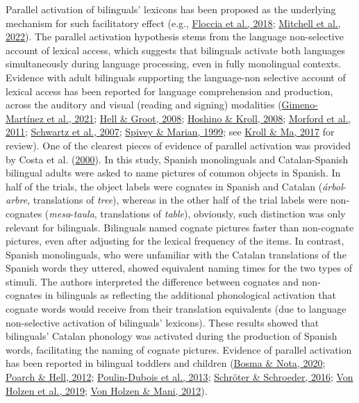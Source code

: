 \documentclass[
]{article}
\begin{document}
Parallel activation of bilinguals' lexicons has been proposed as the
underlying mechanism for such facilitatory effect (e.g.,
\protect\hyperlink{ref-floccia2018introduction}{Floccia et al., 2018};
\protect\hyperlink{ref-mitchell2022cognates}{Mitchell et al., 2022}).
The parallel activation hypothesis stems from the language non-selective
account of lexical access, which suggests that bilinguals activate both
languages simultaneously during language processing, even in fully
monolingual contexts. Evidence with adult bilinguals supporting the
language-non selective account of lexical access has been reported for
language comprehension and production, across the auditory and visual
(reading and signing) modalities
(\protect\hyperlink{ref-gimeno-martinez2021crosslinguistic}{Gimeno-Martínez
et al., 2021}; \protect\hyperlink{ref-vanhell2008sentence}{Hell \&
Groot, 2008}; \protect\hyperlink{ref-hoshino2008cognate}{Hoshino \&
Kroll, 2008}; \protect\hyperlink{ref-morford2011when}{Morford et al.,
2011}; \protect\hyperlink{ref-schwartz2007reading}{Schwartz et al.,
2007}; \protect\hyperlink{ref-spivey1999cross}{Spivey \& Marian, 1999};
see \protect\hyperlink{ref-kroll2017bilingual}{Kroll \& Ma, 2017} for
review). One of the clearest pieces of evidence of parallel activation
was provided by Costa et al.
(\protect\hyperlink{ref-costa2000cognate}{2000}). In this study, Spanish
monolinguals and Catalan-Spanish bilingual adults were asked to name
pictures of common objects in Spanish. In half of the trials, the object
labels were cognates in Spanish and Catalan (\emph{árbol}-\emph{arbre},
translations of \emph{tree}), whereas in the other half of the trial
labels were non-cognates (\emph{mesa}-\emph{taula}, translations of
\emph{table}), obviously, such distinction was only relevant for
bilinguals. Bilinguals named cognate pictures faster than non-cognate
pictures, even after adjusting for the lexical frequency of the items.
In contrast, Spanish monolinguals, who were unfamiliar with the Catalan
translations of the Spanish words they uttered, showed equivalent naming
times for the two types of stimuli. The authors interpreted the
difference between cognates and non-cognates in bilinguals as reflecting
the additional phonological activation that cognate words would receive
from their translation equivalents (due to language non-selective
activation of bilinguals' lexicons). These results showed that
bilinguals' Catalan phonology was activated during the production of
Spanish words, facilitating the naming of cognate pictures. Evidence of
parallel activation has been reported in bilingual toddlers and children
(\protect\hyperlink{ref-bosma2020cognate}{Bosma \& Nota, 2020};
\protect\hyperlink{ref-poarch2012crosslanguage}{Poarch \& Hell, 2012};
\protect\hyperlink{ref-poulin-dubois2013lexical}{Poulin-Dubois et al.,
2013}; \protect\hyperlink{ref-schroter2016orthographic}{Schröter \&
Schroeder, 2016}; \protect\hyperlink{ref-vonholzen2019impact}{Von Holzen
et al., 2019}; \protect\hyperlink{ref-vonholzen2012language}{Von Holzen
\& Mani, 2012}).
\end{document}
